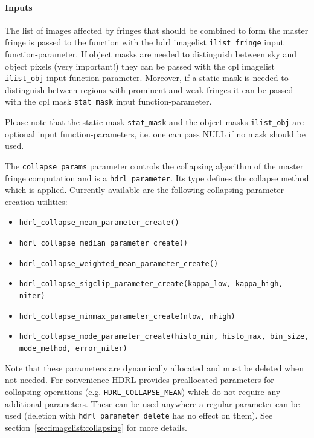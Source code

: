 \paragraph{Inputs}
\label{fringe:algorithms:compute:inputs}

The list of images affected by fringes that should be combined to form
the master fringe is passed to the function with the hdrl imagelist
\verb+ilist_fringe+ input function-parameter.  If object masks are
needed to distinguish between sky and object pixels (very important!)
they can be passed with the cpl imagelist \verb+ilist_obj+ input
function-parameter.  Moreover, if a static mask is needed to
distinguish between regions with prominent and weak fringes it can be
passed with the cpl mask \verb+stat_mask+ input function-parameter.

Please note that the static mask \verb,stat_mask, and the object masks
\verb,ilist_obj, are optional input function-parameters, i.e. one can
pass NULL if no mask should be used.

The \verb+collapse_params+ parameter controls the collapsing algorithm
of the master fringe computation and is a \verb+hdrl_parameter+. Its
type defines the collapse method which is applied. Currently available
are the following collapsing parameter creation utilities:
\begin{itemize}\itemsep-1pt \parskip0pt \small
\item \verb+hdrl_collapse_mean_parameter_create()+
\item \verb+hdrl_collapse_median_parameter_create()+
\item \verb+hdrl_collapse_weighted_mean_parameter_create()+
\item \verb+hdrl_collapse_sigclip_parameter_create(kappa_low, kappa_high, niter)+
\item \verb+hdrl_collapse_minmax_parameter_create(nlow, nhigh)+
\item \verb+hdrl_collapse_mode_parameter_create(histo_min, histo_max, bin_size,+\\\verb+mode_method, error_niter)+
\end{itemize}

Note that these parameters are dynamically allocated and must be
deleted when not needed.  For convenience HDRL provides preallocated
parameters for collapsing operations (e.g. \verb+HDRL_COLLAPSE_MEAN+)
which do not require any additional parameters. These can be used
anywhere a regular parameter can be used (deletion with
\verb+hdrl_parameter_delete+ has no effect on them). See
section~\ref{sec:imagelist:collapsing} for more details.

